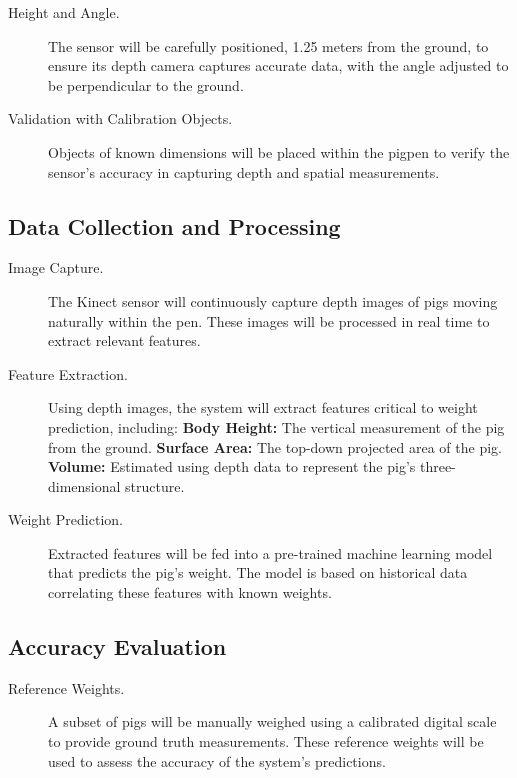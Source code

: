 {\begin{description}
	
	\item[Height and Angle.]
	The sensor will be carefully positioned, 1.25 meters from the ground, to ensure its depth camera captures accurate data, with the angle adjusted to be perpendicular to the ground.
	
	\item[Validation with Calibration Objects.]
	Objects of known dimensions will be placed within the pigpen to verify the sensor’s accuracy in capturing depth and spatial measurements.
	
\end{description}

\subsection{Data Collection and Processing}

\begin{description}
	\item[Image Capture.]
	The Kinect sensor will continuously capture depth images of pigs moving naturally within the pen. These images will be processed in real time to extract relevant features.
	
	\item[Feature Extraction.]
	Using depth images, the system will extract features critical to weight prediction, including:
	\subitem 
	\textbf{Body Height:} The vertical measurement of the pig from the ground.
	\subitem
	\textbf{Surface Area:} The top-down projected area of the pig.
	\subitem
	\textbf{Volume:} Estimated using depth data to represent the pig’s three-dimensional structure.
	
	\item[Weight Prediction.]
	Extracted features will be fed into a pre-trained machine learning model that predicts the pig's weight. The model is based on historical data correlating these features with known weights.
	
\end{description}

\subsection{Accuracy Evaluation}

\begin{description}
	\item[Reference Weights.]
	A subset of pigs will be manually weighed using a calibrated digital scale to provide ground truth measurements. These reference weights will be used to assess the accuracy of the system's predictions.
	

\end{description}}

